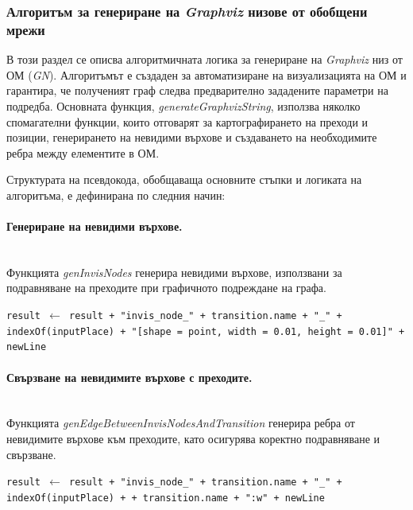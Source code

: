 \subsubsection{Алгоритъм за генериране на \textit{Graphviz} низове от обобщени мрежи}

\hspace*{2.5em}В този раздел се описва алгоритмичната логика за генериране на \textit{Graphviz} низ от ОМ (\textit{GN}). Алгоритъмът е създаден за автоматизиране на визуализацията на ОМ и гарантира, че полученият граф следва предварително зададените параметри на подредба. Основната функция, \textit{generateGraphvizString}, използва няколко спомагателни функции, които отговарят за картографирането на преходи и позиции, генерирането на невидими върхове и създаването на необходимите ребра между елементите в ОМ.

Структурата на псевдокода, обобщаваща основните стъпки и логиката на алгоритъма, е дефинирана по следния начин:

\vspace{-0.3cm}

\paragraph{Генериране на невидими върхове.}
\mbox{}\\
Функцията \textit{genInvisNodes} генерира невидими върхове, използвани за подравняване на преходите при графичното подреждане на графа.

\begin{algorithm}[H]
\caption{genInvisNodes(result, genNet, transition)}
\begin{algorithmic}
    \State \texttt{result $\gets$ result + "invis\_node\_"{} + transition.name + "\_"{} + indexOf(inputPlace) + "[shape = point, width = 0.01, height = 0.01]"{} + newLine}
\EndFor
\end{algorithmic}
\end{algorithm}

\paragraph{Свързване на невидимите върхове с преходите.}
\mbox{}\\
Функцията \textit{genEdgeBetweenInvisNodesAndTransition} генерира ребра от невидимите върхове към преходите, като осигурява коректно подравняване и свързване.

\begin{algorithm}[H]
\caption{genEdgeBetweenInvisNodesAndTransition(result, genNet, transition)}
\begin{algorithmic}
    \State \texttt{result $\gets$ result + "invis\_node\_"{} + transition.name + "\_"{} + indexOf(inputPlace) +  +  transition.name + ":w"{} + newLine}
\EndFor
\end{algorithmic}
\end{algorithm}

